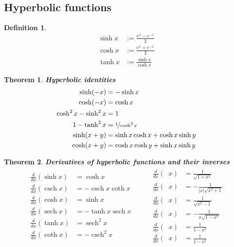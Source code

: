\documentclass{article}
\DeclareMathOperator{\csch}{csch}
\DeclareMathOperator{\arccosh}{\text{cosh}^{-1}}
\DeclareMathOperator{\arcsinh}{\text{sinh}^{-1}}
\DeclareMathOperator{\arctanh}{\text{tanh}^{-1}}
\DeclareMathOperator{\arcsech}{\text{sech}^{-1}}
\DeclareMathOperator{\arccsch}{\text{csch}^{-1}}
\DeclareMathOperator{\arccoth}{\text{coth}^{-1}}
\DeclareMathOperator{\sech}{sech}
\theoremstyle{sltheorem}
\newtheorem{definition}{Definition}[section]
\newtheorem{theorem}{Theorem}[section]
\begin{document}
\subsection{Hyperbolic functions}
\begin{definition}
    \begin{align*}
        \sinh x &:= \frac{e^x-e^{-x}}{2}\\
        \cosh x &:= \frac{e^x+e^{-x}}{2}\\
        \tanh x &:= \frac{\sinh x}{\cosh x}
    \end{align*}
\end{definition}
\begin{theorem}
    \textbf{Hyperbolic identities}
    \begin{align*}
        \sinh(-x) &= -\sinh x\\
        \cosh(-x) &= \cosh x\\
        \cosh^2x - \sinh^2x &= 1\\
        1-\tanh^2 x &= \nicefrac{1}{\cosh^2x}\\
        \sinh(x+y) &=\sinh x \cosh x + \cosh x \sinh y\\
        \cosh(x+y) &= \cosh x \cosh y + \sinh x \sinh y 
    \end{align*}
\end{theorem}
\begin{theorem}
    \textbf{Derivatives of hyperbolic functions and their inverses}
    \begin{align*}
        \begin{aligned}
            \frac{d}{dx}(\sinh x)&=\cosh x\\
            \frac{d}{dx}(\csch x)&=-\csch x \coth x\\
            \frac{d}{dx}(\cosh x)&=\sinh x\\
            \frac{d}{dx}(\sech x)&= -\tanh x \sech x\\
            \frac{d}{dx}(\tanh x)&=\sech^2 x\\
            \frac{d}{dx}(\coth x)&= -\csch^2 x
        \end{aligned}
        \hspace{1cm}
        \begin{aligned}
            \frac{d}{dx}(\arcsinh x)&=\frac{1}{\sqrt{1+x^2}}\\
            \frac{d}{dx}(\arccsch x)&=-\frac{1}{|x|\sqrt{x^2+1}}\\
            \frac{d}{dx}(\arccosh x)&=\frac{1}{\sqrt{x^2-1}}\\
            \frac{d}{dx}(\arcsech x)&= -\frac{1}{x\sqrt{1-x^2}}\\
            \frac{d}{dx}(\arctanh x)&=\frac{1}{1-x^2}\\
            \frac{d}{dx}(\arccoth x)&= \frac{1}{1-x^2}
        \end{aligned}
    \end{align*}
\end{theorem}
\end{document}
